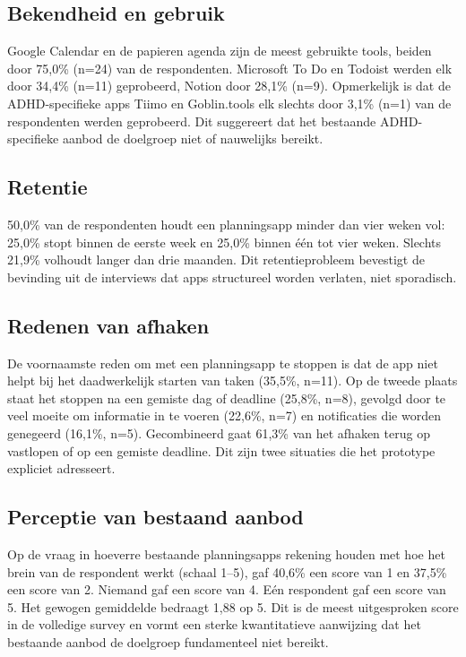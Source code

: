 \subsection{Bekendheid en gebruik}

Google Calendar en de papieren agenda zijn de meest gebruikte tools, beiden door
75,0\% (n=24) van de respondenten. Microsoft To Do en Todoist werden elk door
34,4\% (n=11) geprobeerd, Notion door 28,1\% (n=9). Opmerkelijk is dat de
ADHD-specifieke apps Tiimo en Goblin.tools elk slechts door 3,1\% (n=1) van
de respondenten werden geprobeerd. Dit suggereert dat het bestaande ADHD-specifieke
aanbod de doelgroep niet of nauwelijks bereikt.

\subsection{Retentie}

50,0\% van de respondenten houdt een planningsapp minder dan vier weken vol:
25,0\% stopt binnen de eerste week en 25,0\% binnen één tot vier weken. Slechts
21,9\% volhoudt langer dan drie maanden. Dit retentieprobleem bevestigt de
bevinding uit de interviews dat apps structureel worden verlaten, niet sporadisch.

\subsection{Redenen van afhaken}

De voornaamste reden om met een planningsapp te stoppen is dat de app niet helpt
bij het daadwerkelijk starten van taken (35,5\%, n=11). Op de tweede plaats staat
het stoppen na een gemiste dag of deadline (25,8\%, n=8), gevolgd door te veel
moeite om informatie in te voeren (22,6\%, n=7) en notificaties die worden
genegeerd (16,1\%, n=5). Gecombineerd gaat 61,3\% van het afhaken terug op
vastlopen of op een gemiste deadline. Dit zijn twee situaties die het prototype expliciet
adresseert.

\subsection{Perceptie van bestaand aanbod}

Op de vraag in hoeverre bestaande planningsapps rekening houden met hoe het
brein van de respondent werkt (schaal 1--5), gaf 40,6\% een score van 1 en
37,5\% een score van 2. Niemand gaf een score van 4. Eén respondent gaf een
score van 5. Het gewogen gemiddelde bedraagt 1,88 op 5. Dit is de meest
uitgesproken score in de volledige survey en vormt een sterke kwantitatieve
aanwijzing dat het bestaande aanbod de doelgroep fundamenteel niet bereikt.

